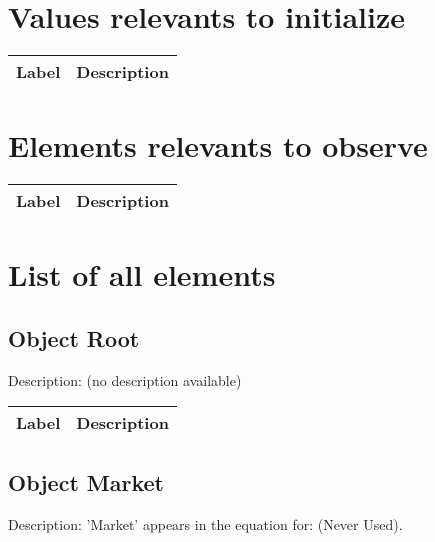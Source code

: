 \newcommand{\lsd}[1] {\textit{#1}}
\section{Values relevants to initialize}
\begin{longtable}{||p{3cm}|p{10cm}||}
  \hline
  \textbf{Label} & \textbf{Description} \\  \hline \endhead 
\end{longtable}

\section{Elements relevants to observe}
\begin{longtable}{||p{3cm}|p{10cm}||}
  \hline
  \textbf{Label} & \textbf{Description} \\  \hline \endhead 
\end{longtable}

\section{List of all elements}
\subsection{Object \textbf{Root}}

Description: (no description available)


\begin{longtable}{||p{3cm}|p{11cm}||}
  \hline
  \textbf{Label} & \textbf{Description} \\  \hline \endhead 
\end{longtable}

\subsection{Object \textbf{Market}}

Description: 'Market' appears in the equation for: (Never Used).


